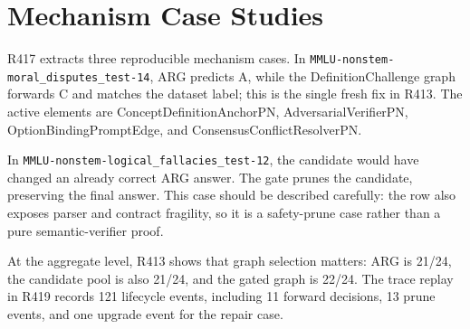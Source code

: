 \section{Mechanism Case Studies}
\label{sec:cases}

R417 extracts three reproducible mechanism cases. In \texttt{MMLU-nonstem-moral\_disputes\_test-14}, ARG predicts A, while the DefinitionChallenge graph forwards C and matches the dataset label; this is the single fresh fix in R413. The active elements are ConceptDefinitionAnchorPN, AdversarialVerifierPN, OptionBindingPromptEdge, and ConsensusConflictResolverPN.

In \texttt{MMLU-nonstem-logical\_fallacies\_test-12}, the candidate would have changed an already correct ARG answer. The gate prunes the candidate, preserving the final answer. This case should be described carefully: the row also exposes parser and contract fragility, so it is a safety-prune case rather than a pure semantic-verifier proof.

At the aggregate level, R413 shows that graph selection matters: ARG is 21/24, the candidate pool is also 21/24, and the gated graph is 22/24. The trace replay in R419 records 121 lifecycle events, including 11 forward decisions, 13 prune events, and one upgrade event for the repair case.
